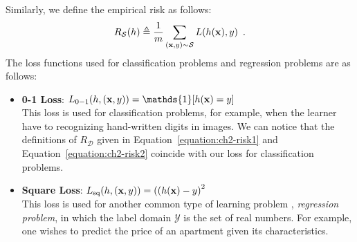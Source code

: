 Similarly, we define the empirical risk as follows:
\begin{equation}
  R_{\mathcal{S}}(h) \triangleq \frac{1}{m} \sum_{(\mathbf{x}, y) \sim \mathcal{S}} L(h(\mathbf{x}), y) \enspace.
\end{equation}
The loss functions used for classification problems and regression problems are as follows: 
\begin{itemize}
  \item \textbf{0-1 Loss}: $L_{0-1}(h, (\xvec, y)) = \mathds{1}\left[ h(\xvec) = y \right]$ \\
  This loss is used for classification problems, for example, when the learner have to recognizing hand-written digits in images.
  We can notice that the definitions of $R_{\mathcal{D}}$ given in Equation~\ref{equation:ch2-risk1} and Equation~\ref{equation:ch2-risk2} coincide with our loss for classification problems.
  \item \textbf{Square Loss}: $L_{\text{sq}}(h, (\xvec, y)) = \left((h(\xvec) - y \right)^2$ \\	
  This loss is used for another common type of learning problem \ie, \emph{regression problem}, in which the label domain $\mathcal{Y}$ is the set of real numbers.
  For example, one wishes to predict the price of an apartment given its characteristics.
\end{itemize}


